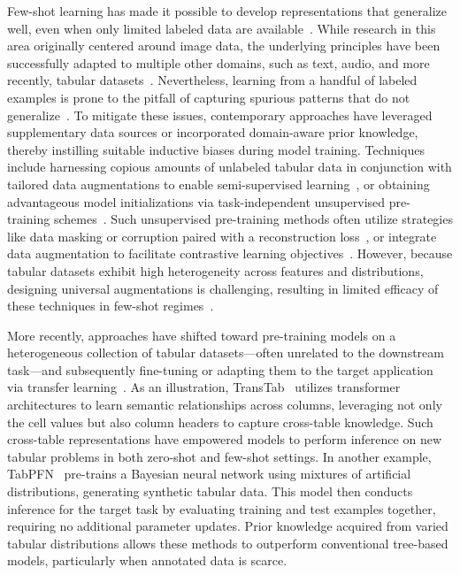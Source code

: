 Few-shot learning has made it possible to develop representations that generalize well, even when only limited labeled data are available~\cite{chen2018closer}. While research in this area originally centered around image data, the underlying principles have been successfully adapted to multiple other domains, such as text, audio, and more recently, tabular datasets~\cite{majumder2022few,nam2023stunt,schick2021exploiting}. Nevertheless, learning from a handful of labeled examples is prone to the pitfall of capturing spurious patterns that do not generalize~\cite{bartlett2021deep}. To mitigate these issues, contemporary approaches have leveraged supplementary data sources or incorporated domain-aware prior knowledge, thereby instilling suitable inductive biases during model training. Techniques include harnessing copious amounts of unlabeled tabular data in conjunction with tailored data augmentations to enable semi-supervised learning~\cite{ucar2021subtab,yoon2020vime}, or obtaining advantageous model initializations via task-independent unsupervised pre-training schemes~\cite{somepalli2021saint}. Such unsupervised pre-training methods often utilize strategies like data masking or corruption paired with a reconstruction loss~\cite{arik2021tabnet,majmundar2022met}, or integrate data augmentation to facilitate contrastive learning objectives~\cite{bahri2022scarf,chen2020simple}. However, because tabular datasets exhibit high heterogeneity across features and distributions, designing universal augmentations is challenging, resulting in limited efficacy of these techniques in few-shot regimes~\cite{nam2023stunt}. 

More recently, approaches have shifted toward pre-training models on a heterogeneous collection of tabular datasets—often unrelated to the downstream task—and subsequently fine-tuning or adapting them to the target application via transfer learning~\cite{zhang2023generative,levin2022transfer,zhu2023xtab}. As an illustration, TransTab~\cite{wang2022transtab} utilizes transformer architectures to learn semantic relationships across columns, leveraging not only the cell values but also column headers to capture cross-table knowledge. Such cross-table representations have empowered models to perform inference on new tabular problems in both zero-shot and few-shot settings. In another example, TabPFN~\cite{hollmann2022tabpfn} pre-trains a Bayesian neural network using mixtures of artificial distributions, generating synthetic tabular data. This model then conducts inference for the target task by evaluating training and test examples together, requiring no additional parameter updates. Prior knowledge acquired from varied tabular distributions allows these methods to outperform conventional tree-based models, particularly when annotated data is scarce.

